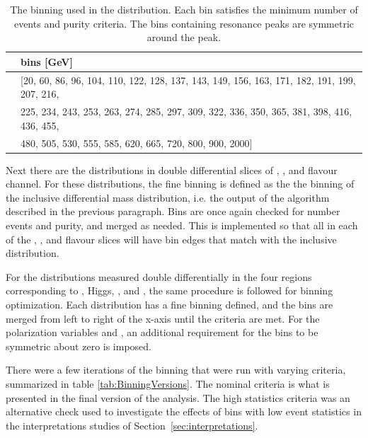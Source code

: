 \begin{table}[ht]  
    \begin{tabular}{ c | l}
        \hline
         & \mFourL{} bins [GeV]\\
        \hline
         \mFourL{} &  [20, 60, 86, 96, 104, 110, 122, 128, 137, 143, 149, 156, 163, 171, 182, 191, 199, 207, 216, \\
         			& 225, 234, 243, 253, 263, 274, 285, 297, 309, 322, 336, 350, 365, 381, 398, 416, 436, 455,   \\
        		& 480, 505, 530, 555, 585, 620, 665, 720, 800, 900, 2000] \\
        
        \hline
    \end{tabular}
    \caption{The binning used in the \mFourL{} distribution. Each bin satisfies the minimum number of events and purity criteria. The bins containing resonance peaks are symmetric around the peak.}
    \label{tab:m4lbin}
\end{table}  

Next there are the \mFourL{} distributions in double differential slices of \ptFourL, \yFourL, and flavour channel. For these distributions, the fine binning is defined as the the binning of the inclusive \mFourL{} differential mass distribution, i.e. the output of the algorithm described in the previous paragraph. Bins are once again checked for number events and purity, and merged as needed. This is implemented so that all \mFourL{} in each of the  \ptFourL, \yFourL, and flavour slices will have bin edges that match with the inclusive distribution. 

For the distributions measured double differentially in the four \mFourL{} regions corresponding to \Z, Higgs, \onshellZZ, and \offshellZZ, the same procedure is followed for binning optimization. Each distribution has a fine binning defined, and the bins are merged from left to right of the x-axis until the criteria are met. For the polarization variables \CTSOneTwo and \CTSThreeFour, an additional requirement for the bins to be symmetric about zero is imposed.

There were a few iterations of the binning that were run with varying criteria, summarized in table \ref{tab:BinningVersions}. The nominal criteria is what is presented in the final version of the analysis. The high statistics criteria was an alternative check used to investigate the effects of bins with low event statistics in the interpretations studies of Section~\ref{sec:interpretations}.

